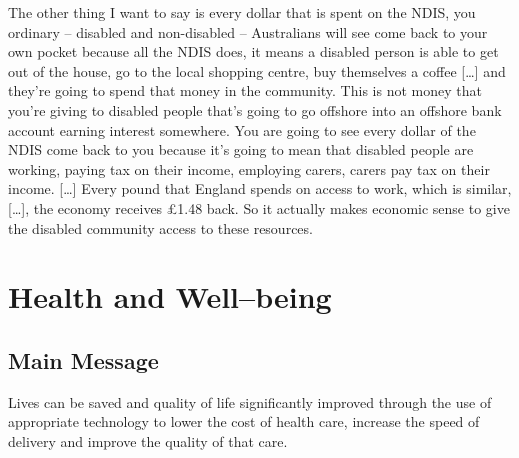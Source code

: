 \begin{savequote}[10cm] %
\sffamily
The other thing I want to say is every dollar that is spent on the NDIS, you ordinary -- disabled and non-disabled -- Australians will see come back to your own pocket because all the NDIS does, it means a disabled person is able to get out of the house, go to the local shopping centre, buy themselves a coffee [\ldots] and they're going to spend that money in the community. 
This is not money that you're giving to disabled people that's going to go offshore into an offshore bank account earning interest somewhere. You are going to see every dollar of the NDIS come back to you because it's going to mean that disabled people are working, paying tax on their income, employing carers, carers pay tax on their income. [\dots] Every pound that England spends on access to work, which is similar, [\ldots], the economy receives £1.48 back. So it actually makes economic sense to give the disabled community access to these resources.
\end{savequote}

\chapter{Health and Well--being}
\label{chap:health}

\section{Main Message}

Lives can be saved and quality of life significantly improved through the use of appropriate technology to lower the cost of health care, increase the speed of delivery and improve the quality of that care.

